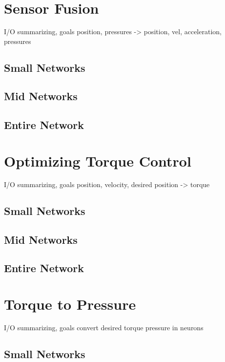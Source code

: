 \section{Sensor Fusion}

I/O summarizing, goals
position, pressures -> position, vel, acceleration, pressures

\subsection{Small Networks}

\subsection{Mid Networks}

\subsection{Entire Network}

\section{Optimizing Torque Control}

I/O summarizing, goals
position, velocity, desired position -> torque

\subsection{Small Networks}

\subsection{Mid Networks}

\subsection{Entire Network}

\section{Torque to Pressure}

I/O summarizing, goals
convert desired torque pressure in neurons

\subsection{Small Networks}

